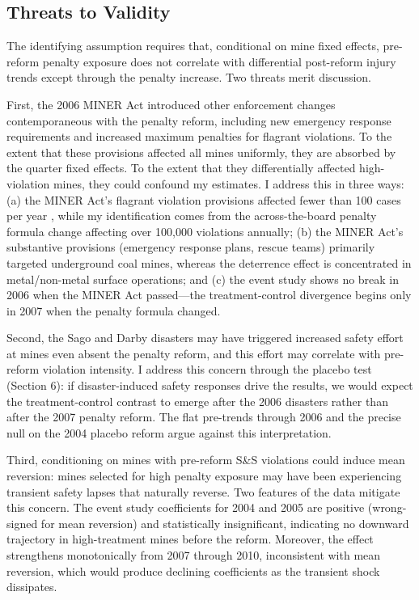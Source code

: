 \documentclass[12pt]{article}
\begin{document}
\subsection{Threats to Validity}

The identifying assumption requires that, conditional on mine fixed effects, pre-reform penalty exposure does not correlate with differential post-reform injury trends except through the penalty increase. Two threats merit discussion.

First, the 2006 MINER Act introduced other enforcement changes contemporaneous with the penalty reform, including new emergency response requirements and increased maximum penalties for flagrant violations. To the extent that these provisions affected all mines uniformly, they are absorbed by the quarter fixed effects. To the extent that they differentially affected high-violation mines, they could confound my estimates. I address this in three ways: (a) the MINER Act's flagrant violation provisions affected fewer than 100 cases per year \citep{li2022enforcement}, while my identification comes from the across-the-board penalty formula change affecting over 100,000 violations annually; (b) the MINER Act's substantive provisions (emergency response plans, rescue teams) primarily targeted underground coal mines, whereas the deterrence effect is concentrated in metal/non-metal surface operations; and (c) the event study shows no break in 2006 when the MINER Act passed---the treatment-control divergence begins only in 2007 when the penalty formula changed.

Second, the Sago and Darby disasters may have triggered increased safety effort at mines even absent the penalty reform, and this effort may correlate with pre-reform violation intensity. I address this concern through the placebo test (Section 6): if disaster-induced safety responses drive the results, we would expect the treatment-control contrast to emerge after the 2006 disasters rather than after the 2007 penalty reform. The flat pre-trends through 2006 and the precise null on the 2004 placebo reform argue against this interpretation.

Third, conditioning on mines with pre-reform S\&S violations could induce mean reversion: mines selected for high penalty exposure may have been experiencing transient safety lapses that naturally reverse. Two features of the data mitigate this concern. The event study coefficients for 2004 and 2005 are positive (wrong-signed for mean reversion) and statistically insignificant, indicating no downward trajectory in high-treatment mines before the reform. Moreover, the effect strengthens monotonically from 2007 through 2010, inconsistent with mean reversion, which would produce declining coefficients as the transient shock dissipates.
\end{document}
